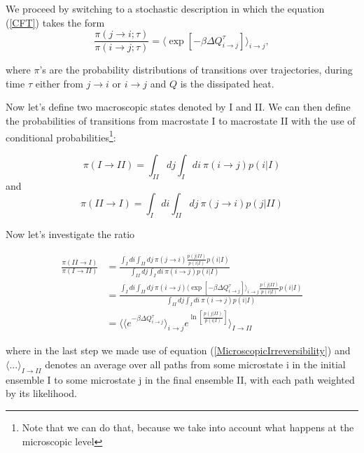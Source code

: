 \documentclass[a4paper,12pt]{article}
\begin{document}
We proceed by switching to a stochastic description in which the equation (\ref{CFT}) takes the form
\begin{equation}
\label{MicroscopicIrreversibility}
\frac{\pi (j\to i;\tau )}{\pi (i\to j;\tau )}= \langle \exp[-\beta  \Delta Q_{i\to j}^{\tau}] \rangle_{i \to j},
\end{equation}

where $\pi$'s are the probability distributions of transitions over trajectories, during time $\tau$ either from $ j\to i$ or $ i \to j $ and $Q$ is the dissipated heat.

Now let's define two macroscopic states denoted by I and II.
We can then define the probabilities of transitions from macrostate I to macrostate II with the use of conditional probabilities\footnote{Note that we can do that, because we take into account what happens at the microscopic level}:

\begin{equation}
  \pi (I\to II)=\int_{II} d j \int_I d i\ \pi(i\to j)p(i|I)
\end{equation}
and
\begin{equation}
  \pi (II\to I)=\int_{I} d i \int_{II} d j\ \pi(j\to i)p(j|II)
\end{equation}

Now let's investigate the ratio

\begin{equation}
\begin{aligned}
\label{MacrostatesPRatio2}
  \frac{\pi(II \to I)}{\pi(I \to II)} &= \frac{\int_{I} d i \int_{II} d j\ \pi(j\to i)\frac{p(j|II)}{p(i|I)}p(i|I)}{\int_{II} d j \int_I d i\ \pi(i\to j)p(i|I)}\\
  &= \frac{\int_{I} d i \int_{II} d j\ \pi(i\to j) \langle \exp[- \beta \Delta Q_{i\to j}^{\tau}] \rangle_{i \to j}  \frac{p(j|II)}{p(i|I)}p(i|I)}{\int_{II} d j \int_I d i\ \pi(i\to j) p(i|I)}\\
  &=\langle \langle e^{- \beta \Delta Q_{i\to j}^{\tau}} \rangle_{i \to j} e^{\ln[\frac{p(j|II)}{p(i|I)}]} \rangle_{I \to II}
\end{aligned}
\end{equation}

where in the last step we made use of equation (\ref{MicroscopicIrreversibility}) and  $\langle ... \rangle_{I \to II}$ denotes an average over all paths from some microstate
i in the initial ensemble I to some microstate j in the final ensemble
II, with each path weighted by its likelihood.
\end{document}
